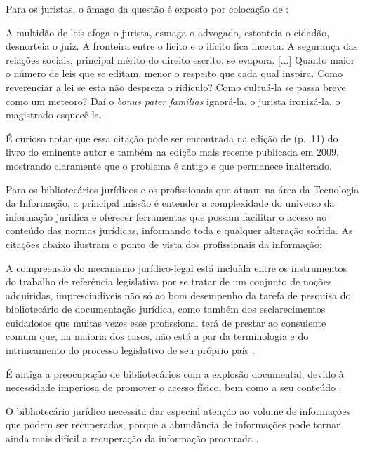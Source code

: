 \documentclass[a4paper,11pt,openright,twoside,english,brazil]{abntex2}
\begin{document}
Para os juristas, o âmago da questão é exposto por colocação de
:

\begin{citacao}
A multidão de leis afoga o jurista, esmaga o advogado, estonteia o cidadão,
desnorteia o juiz. A fronteira entre o lícito e o ilícito fica incerta. A
segurança das relações sociais, principal mérito do direito escrito, se
evapora. [...] Quanto maior o número de leis que se editam, menor o respeito
que cada qual inspira. Como reverenciar a lei se esta não despreza o ridículo?
Como cultuá-la se passa breve como um meteoro? Daí o \emph{bonus pater familias}
ignorá-la, o jurista ironizá-la, o magistrado esquecê-la.
\end{citacao}

É curioso notar que essa citação pode ser encontrada na edição de
\citeyear{ferreira-filho1968} (p.~11) do livro do eminente autor e também na
edição mais recente publicada em 2009, mostrando claramente que o problema é
antigo e que permanece inalterado.

Para os bibliotecários jurídicos e os profissionais que atuam na área da
Tecnologia da Informação, a principal missão é entender a complexidade do
universo da informação jurídica e oferecer ferramentas que possam facilitar o
acesso ao conteúdo das normas jurídicas, informando toda e qualquer alteração
sofrida. As citações abaixo ilustram o ponto de vista dos profissionais da
informação:

\begin{citacao}
A compreensão do mecanismo jurídico-legal está incluída entre os instrumentos do
trabalho de referência legislativa por se tratar de um conjunto de noções
adquiridas, imprescindíveis não só ao bom desempenho da tarefa de pesquisa do
bibliotecário de documentação jurídica, como também dos esclarecimentos
cuidadosos que muitas vezes esse profissional terá de prestar ao consulente
comum que, na maioria dos casos, não está a par da terminologia e do
intrincamento do processo legislativo de seu próprio país
\cite[p.~20]{atienza1979}.
\end{citacao}

\begin{citacao}
É antiga a preocupação de bibliotecários com a explosão documental, devido à
necessidade imperiosa de promover o acesso físico, bem como a seu conteúdo
\cite[p.~364]{passos1994}.
\end{citacao}

\begin{citacao}
O bibliotecário jurídico necessita dar especial atenção ao volume de informações
que podem ser recuperadas, porque a abundância de informações pode tornar ainda
mais difícil a recuperação da informação procurada \cite[p.~96]{passos2009}.
\end{citacao}
\end{document}
